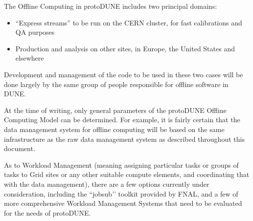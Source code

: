
The Offline Computing in protoDUNE includes two principal domains:
\begin{itemize}
\item ``Express streams'' to be run on the CERN cluster, for fast calibrations and QA purposes
\item Production and analysis on other sites, in Europe, the United States and elsewhere
\end{itemize}

\noindent
Development and management of the code to be used in these two cases will be done largely by the same group of people responsible for offline software in DUNE.

At the time of writing, only general parameters of the protoDUNE Offline Computing Model can be determined. For example, it is fairly certain that the data management system for offline computing will be based on the same infrastructure as the raw data management system as described throughout this document.

As to Workload Management (meaning assigning particular tasks or groups of tasks to Grid sites or any other suitable compute elements, and coordinating that with the data management), there are a few options currently under consideration, including the ``jobsub’’ toolkit provided by FNAL, and a few of more comprehensive Workload Management Systems that need to be evaluated for the needs of protoDUNE.
